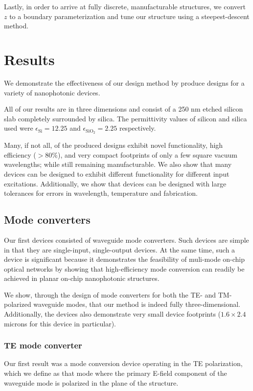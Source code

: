 \documentclass[letterpaper,10pt]{article}
\begin{document}
Lastly, in order to arrive at fully discrete, manufacturable structures,
    we convert $z$ to a boundary parameterization %
    and tune our structure using a steepest-descent method.

\section{Results}
We demonstrate the effectiveness of our design method 
    by produce designs for a variety of nanophotonic devices.

All of our results are in three dimensions
    and consist of a 250 nm etched silicon slab
    completely surrounded by silica.
The permittivity values of silicon and silica used
    were $\epsilon_\text{Si} = 12.25$ and $\epsilon_\text{SiO$_2$} = 2.25$
    respectively.

Many, if not all, of the produced designs exhibit 
    novel functionality, high efficiency ($>80\%$), and 
    very compact footprints of only a few square vacuum wavelengths;
    while still remaining manufacturable.
We also show that many devices can be designed
    to exhibit different functionality for different input excitations.
Additionally, we show that devices can be designed with large tolerances for
    errors in wavelength, temperature and fabrication.

\subsection{Mode converters}

Our first devices consisted of waveguide mode converters.
Such devices are simple in that they are single-input, single-output devices.
At the same time, such a device is significant because 
    it demonstrates the feasibility of muli-mode on-chip optical networks
    by showing that high-efficiency mode conversion 
    can readily be achieved in planar on-chip nanophotonic structures.

We show, through the design of mode converters for both the TE- and TM-polarized
    waveguide modes, 
    that our method is indeed fully three-dimensional.
Additionally, the devices also demonstrate very small device footprints 
    ($1.6 \times 2.4$ microns for this device in particular).

\subsubsection{TE mode converter}
Our first result was a mode conversion device operating in the TE polarization,
    which we define as that mode where the primary E-field component
    of the waveguide mode is polarized in the plane of the structure.
\end{document}
